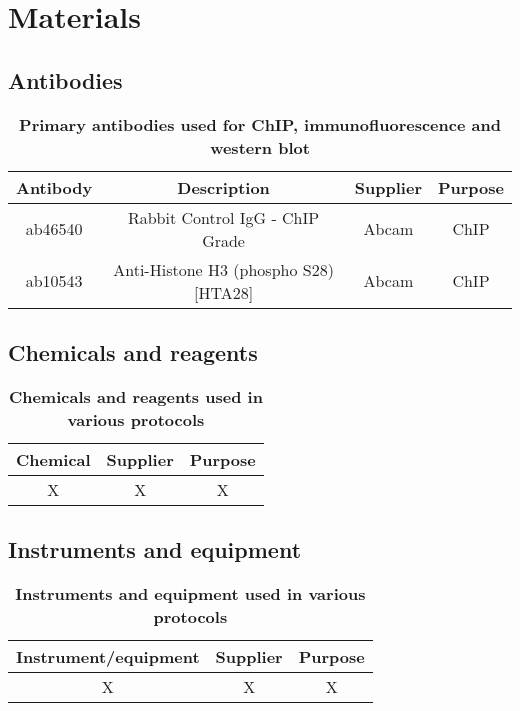\documentclass[11pt,twoside,a4paper]{report}
\begin{document}
	\section{Materials}
		\subsection{Antibodies}
			\begin{table}[!ht]
       		\caption{
            		\bf{Primary antibodies used for ChIP, immunofluorescence and western blot}
        }
        		\begin{center}
            		\begin{tabular}{|c|c|c|c|}
                		\hline
	                Antibody & Description & Supplier & Purpose\\
    		            \hline
        		        ab46540 & Rabbit Control IgG - ChIP Grade & Abcam & ChIP\\
            		    ab10543 & Anti-Histone H3 (phospho S28) [HTA28] & Abcam & ChIP\\
	                \hline
	            \end{tabular}
    		    \end{center}
        		\label{tab:label}
		    \end{table}
		  
		\subsection{Chemicals and reagents}
			\begin{table}[!ht]
       		\caption{
            		\bf{Chemicals and reagents used in various protocols}
        }
        		\begin{center}
            		\begin{tabular}{|c|c|c|}
                		\hline
	                Chemical & Supplier & Purpose\\
    		            \hline
        		        X & X & X\\
	                \hline
	            \end{tabular}
    		    \end{center}
        		\label{tab:label}
		    \end{table}
    
    		\subsection{Instruments and equipment}
			\begin{table}[!ht]
       		\caption{
            		\bf{Instruments and equipment used in various protocols}
        }
        		\begin{center}
            		\begin{tabular}{|c|c|c|}
                		\hline
	                Instrument/equipment & Supplier & Purpose\\
    		            \hline
					X & X & X\\
	                \hline
	            \end{tabular}
    		    \end{center}
        		\label{tab:label}
		    \end{table}
		    
\end{document}
